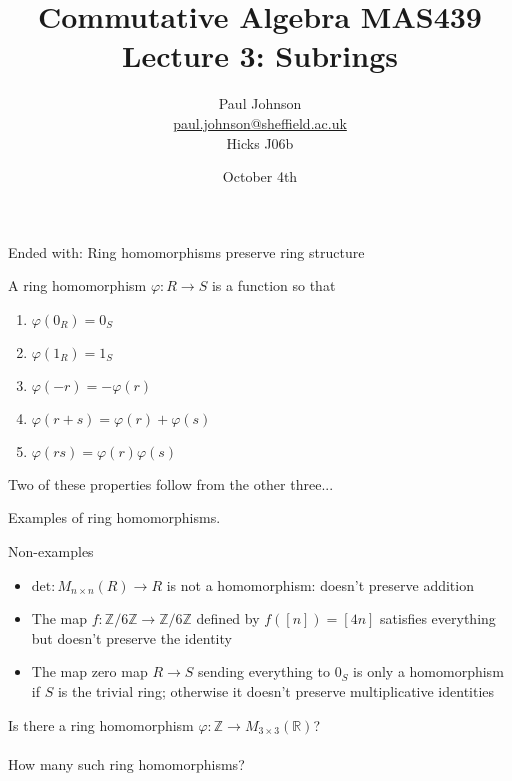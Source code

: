 \documentclass{beamer}
\title{Commutative Algebra MAS439 \\ Lecture 3: Subrings}
\author{Paul Johnson \\ \href{mailto:paul.johnson@sheffield.ac.uk}{paul.johnson@sheffield.ac.uk} \\ Hicks J06b}
\date{October 4th}
\newcommand{\Z}{\mathbb{Z}}
\newcommand{\R}{\mathbb{R}}
\begin{document}
\begin{frame}{Ended with: Ring homomorphisms preserve ring structure}
  \begin{definition}
    A ring homomorphism $\varphi:R\to S$ is a function so that
    \begin{enumerate}
    \item $\varphi(0_R)=0_S$
    \item $\varphi(1_R)=1_S$
     \item $\varphi(-r)=-\varphi(r)$
     \item $\varphi(r+s)=\varphi(r)+ \varphi(s)$
       \item $\varphi(rs)=\varphi(r)\varphi(s)$
      \end{enumerate}
\end{definition}  
Two of these properties follow from the other three...
\end{frame}

\begin{frame}[plain,c]

\begin{center}

\Huge

Examples of ring homomorphisms.
\end{center}

\end{frame}

\begin{frame}{Non-examples}
  \begin{itemize}
  \item $\text{det}: M_{n\times n}(R)\to R$ is not a homomorphism: doesn't preserve addition
  \item The map $f:\Z/6\Z\to \Z/6\Z$ defined by $f([n])=[4n]$ satisfies everything but doesn't preserve the identity
    \item The map zero map $R\to S$ sending everything to $0_S$ is only a homomorphism if $S$ is the trivial ring; otherwise it doesn't preserve multiplicative identities
\end{itemize}
  \end{frame}
\begin{frame}[plain,c]

\begin{center}

\Huge

Is there a ring homomorphism $\varphi:\Z\to M_{3\times 3}(\R)$? \\~\\

How many such ring homomorphisms?
\end{center}

\end{frame}
\end{document}
